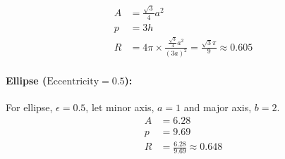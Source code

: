 \begin{align}
	A &= \frac{\sqrt{3}}{4}a^2 \\
	p &= 3h \\
	R &= 4\pi \times \frac{\frac{\sqrt{3}}{4}a^2}{{(3a)}^2} = \frac{\sqrt{3}\pi}{9} \approx 0.605
\end{align}

\paragraph{Ellipse ($\textrm{Eccentricity} = 0.5$):}
\label{par:elipse}

For ellipse, $\epsilon = 0.5$, let minor axis, $a = 1$ and major axis, $b = 2$.
\begin{align}
	A &= 6.28 \\
	p &= 9.69 \\
	R &= \frac{6.28}{9.69} \approx 0.648
\end{align}
